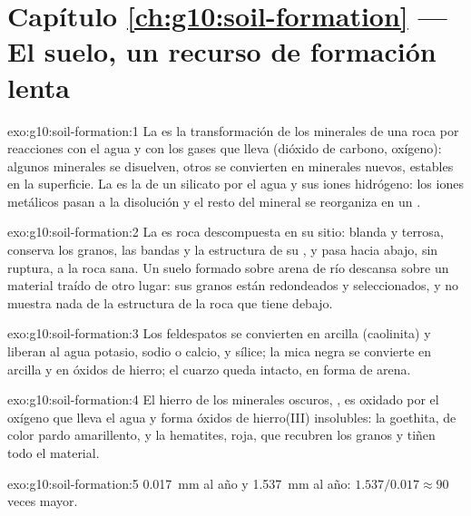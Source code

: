 \section*{Capítulo \ref{ch:g10:soil-formation} --- El suelo, un recurso de formación lenta}

\begin{solution}{exo:g10:soil-formation:1}
La  es la transformación de los minerales de una roca
por reacciones con el agua y con los gases que lleva (dióxido de carbono,
oxígeno): algunos minerales se disuelven, otros se convierten en minerales
nuevos, estables en la superficie. La  es la 
de un silicato por el agua y sus iones hidrógeno: los iones metálicos pasan a
la disolución y el resto del mineral se reorganiza en un .
\end{solution}

\begin{solution}{exo:g10:soil-formation:2}
La  es roca descompuesta en su sitio: blanda y terrosa, conserva los
granos, las bandas y la estructura de su , y pasa hacia abajo, sin
ruptura, a la roca sana. Un suelo formado sobre arena de río descansa sobre un
material traído de otro lugar: sus granos están redondeados y seleccionados,
y no muestra nada de la estructura de la roca que tiene debajo.
\end{solution}

\begin{solution}{exo:g10:soil-formation:3}
Los feldespatos se convierten en arcilla (caolinita) y liberan al agua
potasio, sodio o calcio, y sílice; la mica negra se convierte en arcilla y en
óxidos de hierro; el cuarzo queda intacto, en forma de arena.
\end{solution}

\begin{solution}{exo:g10:soil-formation:4}
El hierro de los minerales oscuros, , es oxidado por el oxígeno que
lleva el agua y forma óxidos de hierro(III) insolubles: la goethita, de color
pardo amarillento, y la hematites, roja, que recubren los granos y tiñen todo
el material.
\end{solution}

\begin{solution}{exo:g10:soil-formation:5}
\qty{0.017}{mm} al año y \qty{1.537}{mm} al año: $1.537/0.017 \approx 90$
veces mayor.
\end{solution}

